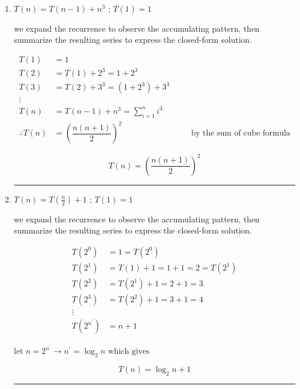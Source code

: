 \begin{enumerate}[label=\arabic*.]
    \item $T(n)=T(n-1)+n^3$ ; $T(1)=1$

    we expand the recurrence to observe the accumulating pattern, then summarize the resulting series to express the closed-form solution.

    \[
    \begin{aligned}
        T(1) &= 1 \\
        T(2) &= T(1) + 2^3 = 1 + 2^3 \\
        T(3) &= T(2) + 3^3 = (1 + 2^3) + 3^3 \\
        \vdots \\
        T(n) &= T(n-1) + n^3 = \sum_{i=1}^n i^3 \\
        \therefore T(n)&=\left(\dfrac{n(n+1)}{2}\right)^2 && \quad \text{by the sum of cube formula}
    \end{aligned}
    \]


    \[
        \boxed{T(n)=\left(\frac{n(n+1)}{2}\right)^2}
    \]

    \medskip
    \begin{center}
        \rule{0.3\linewidth}{0.2pt}
    \end{center}
    \medskip

    \item $T(n)=T\left(\frac{n}{2}\right)+1$ ; $T(1)=1$

    we expand the recurrence to observe the accumulating pattern, then summarize the resulting series to express the closed-form solution.

    \[
    \begin{aligned}
        T(2^0) &= 1 = T(2^0) \\
        T(2^1) &= T(1) + 1 = 1 + 1 = 2 = T(2^1) \\
        T(2^2) &= T(2^1) + 1 = 2 + 1 = 3 \\
        T(2^3) &= T(2^2) + 1 = 3 + 1 = 4 \\
        \vdots \\
        T(2^n^') &= n + 1
    \end{aligned}
    \]

    let $n = {2^{n^'}} \rightarrow {n^'} = \log_2 n \text{ which gives }$

    \[
        \boxed{T(n)=\log_2 n + 1}
    \]

    \medskip
    \begin{center}
        \rule{0.3\linewidth}{0.2pt}
    \end{center}
    \medskip


\end{enumerate}

